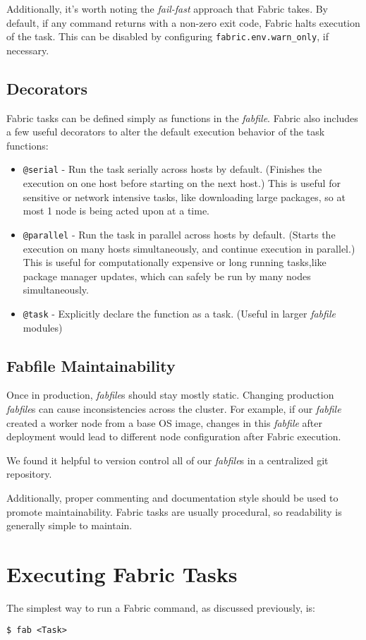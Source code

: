 \documentclass[9pt,twocolumn,twoside]{idsi}
\begin{document}
Additionally, it's worth noting the \emph{fail-fast} approach that Fabric takes. By default, if any command returns with a non-zero exit code, Fabric halts execution of the task. This can be disabled by configuring \texttt{fabric.env.warn\_only}, if necessary.

\subsection{Decorators}
Fabric tasks can be defined simply as functions in the \emph{fabfile}. Fabric also includes a few useful decorators to alter the default execution behavior of the task functions:
\begin{itemize}
  \item \texttt{@serial} - Run the task serially across hosts by default. (Finishes the execution on one host before starting on the next host.) This is useful for sensitive or network intensive tasks, like downloading large packages, so at most 1 node is being acted upon at a time.
  \item \texttt{@parallel} - Run the task in parallel across hosts by default. (Starts the execution on many hosts simultaneously, and continue execution in parallel.) This is useful for computationally expensive or long running tasks,like package manager updates, which can safely be run by many nodes simultaneously.
  \item \texttt{@task} - Explicitly declare the function as a task. (Useful in larger \emph{fabfile} modules)
\end{itemize}

\subsection{Fabfile Maintainability}
Once in production, \emph{fabfile}s should stay mostly static. Changing production \emph{fabfile}s can cause inconsistencies across the cluster. For example, if our \emph{fabfile} created a worker node from a base OS image, changes in this \emph{fabfile} after deployment would lead to different node configuration after Fabric execution.

We found it helpful to version control all of our \emph{fabfile}s in a centralized git repository.

Additionally, proper commenting and documentation style should be used to promote maintainability. Fabric tasks are usually procedural, so readability is generally simple to maintain.

\section{Executing Fabric Tasks}
The simplest way to run a Fabric command, as discussed previously, is:
\begin{verbatim}
$ fab <Task>
\end{verbatim}
\end{document}
